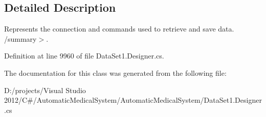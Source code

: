\subsection{Detailed Description}
Represents the connection and commands used to retrieve and save data. /summary$>$. 

Definition at line 9960 of file DataSet1.Designer.cs.

The documentation for this class was generated from the following file:\begin{CompactItemize}
\item 
D:/projects/Visual Studio 2012/C\#/AutomaticMedicalSystem/AutomaticMedicalSystem/DataSet1.Designer.cs\end{CompactItemize}
